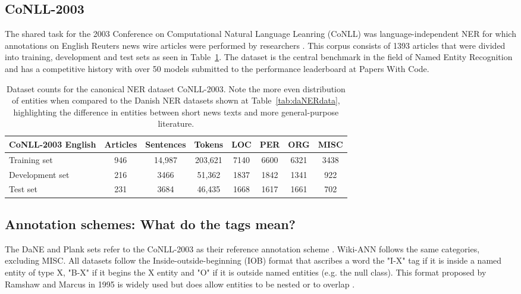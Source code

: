 \documentclass[main.tex]{subfiles}
\begin{document}
\subsection{CoNLL-2003}
The shared task for the 2003 Conference on Computational Natural Language Leanring (CoNLL) was language-independent NER for which annotations on English Reuters news wire articles were performed by researchers \cite{tjang2003conll}.
This corpus consists of 1393 articles that were divided into training, development and test sets as seen in Table~\ref{tab:conll2003}.
The dataset is the central benchmark in the field of Named Entity Recognition \cite[Sec. 4.3]{yamada2020luke} and has a competitive history with over 50 models submitted to the performance leaderboard at Papers With Code\footnotemark.
\begin{table}[H]
    \centering
    \begin{tabular}{l|ccc|cccc}
    CoNLL-2003 English  & Articles  & Sentences  & Tokens   & LOC   & PER   & ORG   & MISC  \\ \hline
    Training set        & 946       & 14,987     & 203,621  & 7140  & 6600  & 6321  & 3438   \\
    Development set     & 216       & 3466      & 51,362   & 1837  & 1842  & 1341  & 922    \\
    Test set            & 231       & 3684      & 46,435   & 1668  & 1617  & 1661  & 702    \\
    \end{tabular}
    \caption{
        Dataset counts for the canonical NER dataset CoNLL-2003.
        Note the more even distribution of entities when compared to the Danish NER datasets shown at Table~\ref{tab:daNERdata}, highlighting the difference in entities between short news texts and more general-purpose literature.
    }
    \label{tab:conll2003}
\end{table}

\subsection{Annotation schemes: What do the tags mean?}
The DaNE and Plank sets refer to the CoNLL-2003 as their reference annotation scheme \cite[Sec. 4]{hvingelby2020dane} \cite[Sec. 2.1]{plank2019neural}.
Wiki-ANN follows the same categories, excluding MISC.
All datasets follow the Inside-outside-beginning (IOB) format that ascribes a word the "I-X" tag if it is inside a named entity of type X, "B-X" if it begins the X entity and "O" if it is outside named entities (e.g. the null class).
This format proposed by Ramshaw and Marcus in 1995 is widely used but does allow entities to be nested or to overlap \cite{ramshaw1995IOB}.
\end{document}
